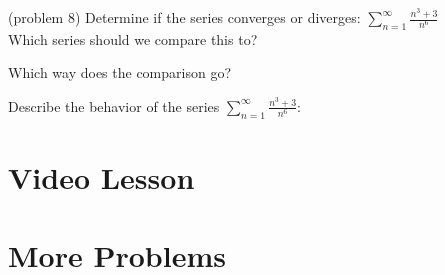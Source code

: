 \documentclass[handout]{ximera}
\begin{document}
\begin{problem}(problem 8)
Determine if the series converges or diverges: $\displaystyle{\sum_{n=1}^\infty \frac{n^3 +3}{n^6}}$\\
Which series should we compare this to?

\begin{multipleChoice}
\end{multipleChoice}

Which way does the comparison go?
\begin{multipleChoice}
\end{multipleChoice}

Describe the behavior of the series $\sum_{n=1}^\infty \frac{n^3+3}{n^6}:$
\begin{multipleChoice}
\end{multipleChoice}

\end{problem}





\section{Video Lesson}

\begin{center}
\begin{foldable}
\end{foldable}
\end{center}


\section{More Problems}
\end{document}
